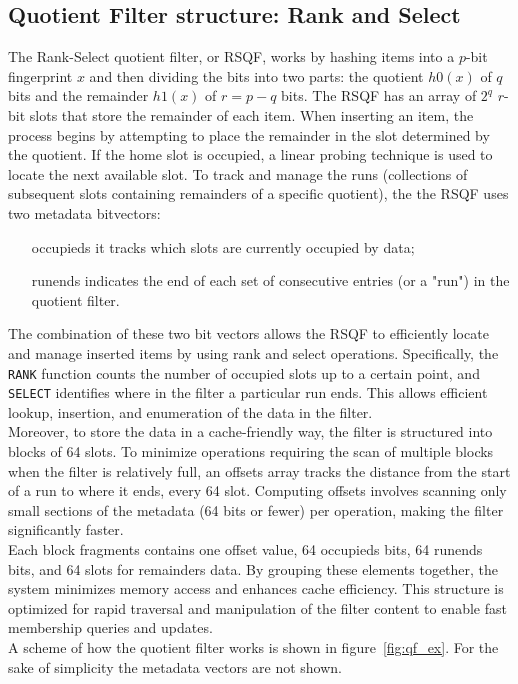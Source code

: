 \subsection{Quotient Filter structure: Rank and Select}
The Rank-Select quotient filter, or RSQF, works by hashing items into a $p$-bit fingerprint $x$ and then dividing the bits into two parts: the quotient $h0(x)$ of $q$ bits and the remainder $h1(x)$ of $r = p - q$ bits. The RSQF has an array of $2^q$ $r$-bit slots that store the remainder of each item. When inserting an item, the process begins by attempting to place the remainder in the slot determined by the quotient. If the home slot is occupied, a linear probing technique is used to locate the next available slot.
To track and manage the runs (collections of subsequent slots containing remainders of a specific quotient), the the RSQF uses two metadata bitvectors:
\begin{itemize}
	\item[occupieds] it tracks which slots are currently occupied by data;
	\item[runends] indicates the end of each set of consecutive entries (or a "run") in the quotient filter.
\end{itemize}
The combination of these two bit vectors allows the RSQF to efficiently locate and manage inserted items by using rank and select operations. Specifically, the \texttt{RANK} function counts the number of occupied slots up to a certain point, and  \texttt{SELECT} identifies where in the filter a particular run ends. This allows efficient lookup, insertion, and enumeration of the data in the filter.\\
Moreover, to store the data in a cache-friendly way, the filter is structured into blocks of 64 slots. To minimize operations requiring the scan of multiple blocks when the filter is relatively full, an offsets array tracks the distance from the start of a run to where it ends, every 64 slot. Computing offsets involves scanning only small sections of the metadata (64 bits or fewer) per operation, making the filter significantly faster.\\
Each block fragments contains one offset value, 64 occupieds bits, 64 runends bits, and 64 slots for remainders data. By grouping these elements together, the system minimizes memory access and enhances cache efficiency. This structure is optimized for rapid traversal and manipulation of the filter content to enable fast membership queries and updates.\\
A scheme of how the quotient filter works is shown in figure~\ref{fig:qf_ex}. For the sake of simplicity the metadata vectors are not shown.

